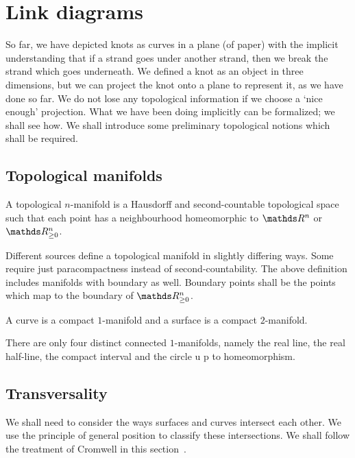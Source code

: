 \section{Link diagrams}

So far, we have depicted knots as curves in a plane (of paper) with the implicit understanding that if a strand goes under another strand, then we break the strand which goes underneath. We defined a knot as an object in three dimensions, but we can project the knot onto a plane to represent it, as we have done so far. We do not lose any topological information if we choose a `nice enough' projection. What we have been doing implicitly can be formalized; we shall see how. We shall introduce some preliminary topological notions which shall be required.

\subsection{Topological manifolds}

\begin{defn}
    A topological \(n\)-manifold is a Hausdorff and second-countable topological space such that each point has a neighbourhood homeomorphic to \(\R^n\) or \(\R^n_{\geq 0}\).
\end{defn}

\begin{remark}
    Different sources define a topological manifold in slightly differing ways. Some require just paracompactness instead of second-countability. The above definition includes manifolds with boundary as well. Boundary points shall be the points which map to the boundary of \(\R^n_{\geq 0}\).
\end{remark}

\begin{defn}
    A curve is a compact \(1\)-manifold and a surface is a compact \(2\)-manifold.
\end{defn}

There are only four distinct connected \(1\)-manifolds, namely the real line, the real half-line, the compact interval and the circle u p to homeomorphism.

\subsection{Transversality}

We shall need to consider the ways surfaces and curves intersect each other. We use the principle of general position to classify these intersections. We shall follow the treatment of Cromwell in this section~\cite[chp.~2, \S~2.10]{cromwell}.

